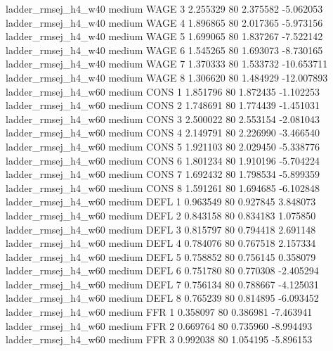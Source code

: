 ladder_rmsej_h4_w40     medium     WAGE                 3  2.255329 80       2.375582          -5.062053
ladder_rmsej_h4_w40     medium     WAGE                 4  1.896865 80       2.017365          -5.973156
ladder_rmsej_h4_w40     medium     WAGE                 5  1.699065 80       1.837267          -7.522142
ladder_rmsej_h4_w40     medium     WAGE                 6  1.545265 80       1.693073          -8.730165
ladder_rmsej_h4_w40     medium     WAGE                 7  1.370333 80       1.533732         -10.653711
ladder_rmsej_h4_w40     medium     WAGE                 8  1.306620 80       1.484929         -12.007893
ladder_rmsej_h4_w60     medium     CONS                 1  1.851796 80       1.872435          -1.102253
ladder_rmsej_h4_w60     medium     CONS                 2  1.748691 80       1.774439          -1.451031
ladder_rmsej_h4_w60     medium     CONS                 3  2.500022 80       2.553154          -2.081043
ladder_rmsej_h4_w60     medium     CONS                 4  2.149791 80       2.226990          -3.466540
ladder_rmsej_h4_w60     medium     CONS                 5  1.921103 80       2.029450          -5.338776
ladder_rmsej_h4_w60     medium     CONS                 6  1.801234 80       1.910196          -5.704224
ladder_rmsej_h4_w60     medium     CONS                 7  1.692432 80       1.798534          -5.899359
ladder_rmsej_h4_w60     medium     CONS                 8  1.591261 80       1.694685          -6.102848
ladder_rmsej_h4_w60     medium     DEFL                 1  0.963549 80       0.927845           3.848073
ladder_rmsej_h4_w60     medium     DEFL                 2  0.843158 80       0.834183           1.075850
ladder_rmsej_h4_w60     medium     DEFL                 3  0.815797 80       0.794418           2.691148
ladder_rmsej_h4_w60     medium     DEFL                 4  0.784076 80       0.767518           2.157334
ladder_rmsej_h4_w60     medium     DEFL                 5  0.758852 80       0.756145           0.358079
ladder_rmsej_h4_w60     medium     DEFL                 6  0.751780 80       0.770308          -2.405294
ladder_rmsej_h4_w60     medium     DEFL                 7  0.756134 80       0.788667          -4.125031
ladder_rmsej_h4_w60     medium     DEFL                 8  0.765239 80       0.814895          -6.093452
ladder_rmsej_h4_w60     medium      FFR                 1  0.358097 80       0.386981          -7.463941
ladder_rmsej_h4_w60     medium      FFR                 2  0.669764 80       0.735960          -8.994493
ladder_rmsej_h4_w60     medium      FFR                 3  0.992038 80       1.054195          -5.896153
